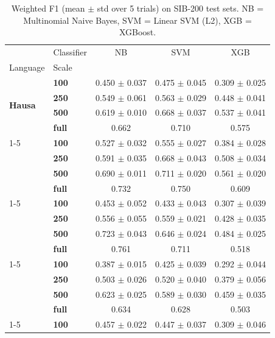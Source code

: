 \begin{table}[t]
\caption{Weighted F1 (mean $\pm$ std over 5 trials) on SIB-200 test sets. NB = Multinomial Naive Bayes, SVM = Linear SVM (L2), XGB = XGBoost.}
\label{tab:main_results}
\begin{tabular}{llccc}
\toprule
 & Classifier & NB & SVM & XGB \\
Language & Scale &  &  &  \\
\midrule
\multirow[t]{4}{*}{\textbf{Hausa}} & \textbf{100} & 0.450 $\pm$ 0.037 & 0.475 $\pm$ 0.045 & 0.309 $\pm$ 0.025 \\
\textbf{} & \textbf{250} & 0.549 $\pm$ 0.061 & 0.563 $\pm$ 0.029 & 0.448 $\pm$ 0.041 \\
\textbf{} & \textbf{500} & 0.619 $\pm$ 0.010 & 0.668 $\pm$ 0.037 & 0.537 $\pm$ 0.041 \\
\textbf{} & \textbf{full} & 0.662 & 0.710 & 0.575 \\
\cline{1-5}
\multirow[t]{4}{*}{\textbf{Igbo}} & \textbf{100} & 0.527 $\pm$ 0.032 & 0.555 $\pm$ 0.027 & 0.384 $\pm$ 0.028 \\
\textbf{} & \textbf{250} & 0.591 $\pm$ 0.035 & 0.668 $\pm$ 0.043 & 0.508 $\pm$ 0.034 \\
\textbf{} & \textbf{500} & 0.690 $\pm$ 0.011 & 0.711 $\pm$ 0.020 & 0.561 $\pm$ 0.020 \\
\textbf{} & \textbf{full} & 0.732 & 0.750 & 0.609 \\
\cline{1-5}
\multirow[t]{4}{*}{\textbf{Luganda}} & \textbf{100} & 0.453 $\pm$ 0.052 & 0.433 $\pm$ 0.043 & 0.307 $\pm$ 0.039 \\
\textbf{} & \textbf{250} & 0.556 $\pm$ 0.055 & 0.559 $\pm$ 0.021 & 0.428 $\pm$ 0.035 \\
\textbf{} & \textbf{500} & 0.723 $\pm$ 0.043 & 0.646 $\pm$ 0.024 & 0.484 $\pm$ 0.025 \\
\textbf{} & \textbf{full} & 0.761 & 0.711 & 0.518 \\
\cline{1-5}
\multirow[t]{4}{*}{\textbf{Oromo}} & \textbf{100} & 0.387 $\pm$ 0.015 & 0.425 $\pm$ 0.039 & 0.292 $\pm$ 0.044 \\
\textbf{} & \textbf{250} & 0.503 $\pm$ 0.026 & 0.520 $\pm$ 0.040 & 0.379 $\pm$ 0.056 \\
\textbf{} & \textbf{500} & 0.623 $\pm$ 0.025 & 0.589 $\pm$ 0.030 & 0.459 $\pm$ 0.035 \\
\textbf{} & \textbf{full} & 0.634 & 0.628 & 0.503 \\
\cline{1-5}
\multirow[t]{4}{*}{\textbf{Rundi}} & \textbf{100} & 0.457 $\pm$ 0.022 & 0.447 $\pm$ 0.037 & 0.309 $\pm$ 0.046 \\

\end{tabular}
\end{table}

